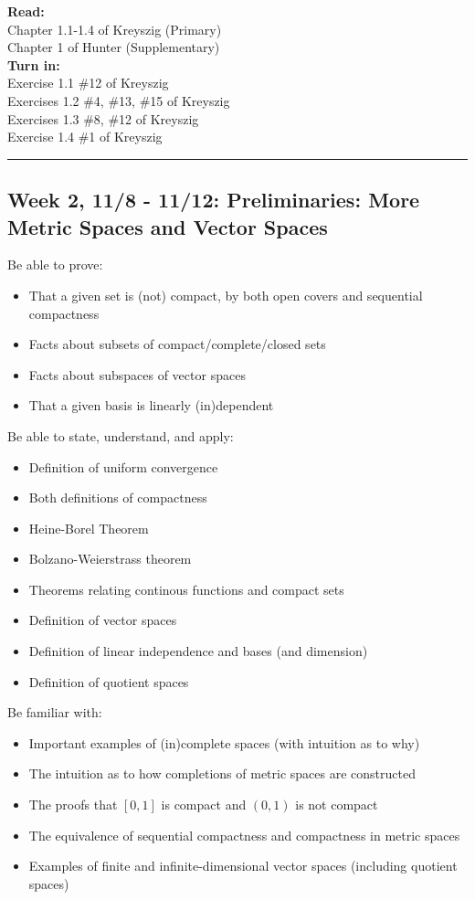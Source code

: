 \documentclass[course=Introduction\ to\ Functional\ Analysis, semester=Fall\ 2021]{syllabustemplate}
\begin{document}
{\textbf{Read:}\\
Chapter 1.1-1.4 of Kreyszig (Primary)\\
Chapter 1 of Hunter (Supplementary)\\

\textbf{Turn in:}\\
Exercise 1.1 \#12 of Kreyszig\\
Exercises 1.2 \#4, \#13, \#15 of Kreyszig\\
Exercises 1.3 \#8, \#12 of Kreyszig\\
Exercise 1.4 \#1 of Kreyszig\\
\hrule
\subsection{Week 2, 11/8 - 11/12: Preliminaries: More Metric Spaces and Vector Spaces}
\label{sub:week_2_11_3_11_10_preliminaries_more_metric_spaces_and_vector_spaces}


Be able to prove:
\begin{itemize}
	\item That a given set is (not) compact, by both open covers and sequential compactness
	\item Facts about subsets of compact/complete/closed sets
	\item Facts about subspaces of vector spaces
	\item That a given basis is linearly (in)dependent
\end{itemize}

Be able to state, understand, and apply:
\begin{itemize}
	\item Definition of uniform convergence
	\item Both definitions of compactness
	\item Heine-Borel Theorem
	\item Bolzano-Weierstrass theorem
	\item Theorems relating continous functions and compact sets
	\item Definition of vector spaces
	\item Definition of linear independence and bases (and dimension)
	\item Definition of quotient spaces
\end{itemize}

Be familiar with:
\begin{itemize}
	\item Important examples of (in)complete spaces (with intuition as to why)
	\item The intuition as to how completions of metric spaces are constructed
	\item The proofs that \(\left[ 0,1 \right] \) is compact and \(\left( 0,1 \right) \) is not compact
	\item The equivalence of sequential compactness and compactness in metric spaces
	\item Examples of finite and infinite-dimensional vector spaces (including quotient spaces)
\end{itemize}
\vspace{1em}

}
\end{document}
